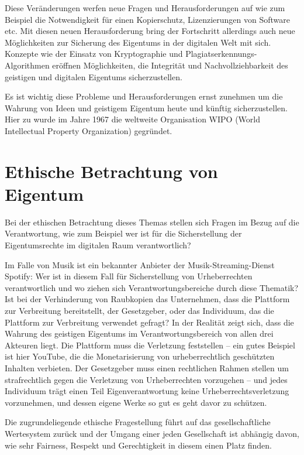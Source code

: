 \documentclass[journal]{IEEEtran}
\begin{document}
\begin{onecolumn}
Diese Veränderungen werfen neue Fragen und Herausforderungen auf wie zum Beispiel 
die Notwendigkeit für einen Kopierschutz, Lizenzierungen von Software etc.
Mit diesen neuen Herausforderung bring der Fortschritt allerdings auch 
neue Möglichkeiten zur Sicherung des Eigentums in der digitalen Welt mit sich.
Konzepte wie der Einsatz von Kryptographie und Plagiatserkennungs-Algorithmen 
eröffnen Möglichkeiten, die Integrität und Nachvollziehbarkeit des geistigen und 
digitalen Eigentums sicherzustellen.

Es ist wichtig diese Probleme und Herausforderungen ernst zunehmen um die Wahrung von 
Ideen und geistigem Eigentum heute und künftig sicherzustellen. Hier zu wurde im Jahre 
1967 die weltweite Organisation WIPO (World Intellectual Property Organization) gegründet. 
\cite{wipo}

\section{Ethische Betrachtung von Eigentum}

Bei der ethischen Betrachtung dieses Themas stellen sich Fragen im Bezug auf die 
Verantwortung, wie zum Beispiel wer ist für die Sicherstellung der Eigentumsrechte
im digitalen Raum verantwortlich?

Im Falle von Musik ist ein bekannter Anbieter der Musik-Streaming-Dienst Spotify: Wer ist 
in diesem Fall für Sicherstellung von Urheberrechten verantwortlich und wo ziehen sich 
Verantwortungsbereiche durch diese Thematik? Ist bei der Verhinderung von Raubkopien 
das Unternehmen, dass die Plattform zur Verbreitung bereitstellt, der Gesetzgeber, oder 
das Individuum, das die Plattform zur Verbreitung verwendet gefragt? In der Realität zeigt 
sich, dass die Wahrung des geistigen Eigentums im Verantwortungsbereich von allen drei 
Akteuren liegt. Die Plattform muss die Verletzung feststellen – ein gutes Beispiel ist 
hier YouTube, die die Monetarisierung von urheberrechtlich geschützten Inhalten verbieten. 
Der Gesetzgeber muss einen rechtlichen Rahmen stellen um strafrechtlich gegen die 
Verletzung von Urheberrechten vorzugehen – und jedes Individuum trägt einen Teil 
Eigenverantwortung keine Urheberrechtsverletzung vorzunehmen, und dessen eigene Werke 
so gut es geht davor zu schützen.

Die zugrundeliegende ethische Fragestellung führt auf das gesellschaftliche Wertesystem 
zurück und der Umgang einer jeden Gesellschaft ist abhängig davon, wie sehr Fairness, 
Respekt und Gerechtigkeit in diesem einen Platz finden.


\end{onecolumn}
\end{document}

